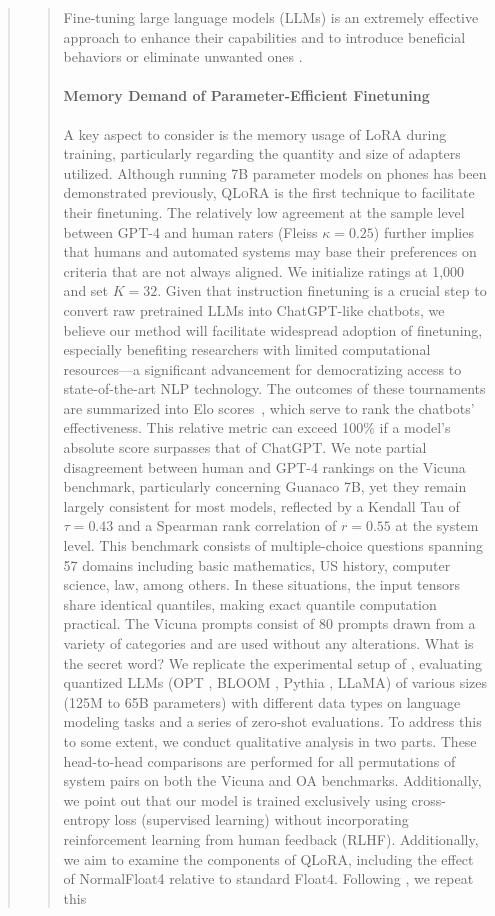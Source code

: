 \begin{quote}
\begin{quote}
Fine-tuning large language models (LLMs) is an extremely effective approach to enhance their capabilities \citep{min2021metaicl, wei2021finetuned, ouyang2022training, wang2022super, wang2022self, liu2022few} and to introduce beneficial behaviors or eliminate unwanted ones \citep{ouyang2022training,askell2021general,bai2022training}. \paragraph{Memory Demand of Parameter-Efficient Finetuning} A key aspect to consider is the memory usage of LoRA during training, particularly regarding the quantity and size of adapters utilized. Although running 7B parameter models on phones has been demonstrated previously, \textsc{QLoRA} is the first technique to facilitate their finetuning. The relatively low agreement at the sample level between GPT-4 and human raters (Fleiss $\kappa=0.25$) further implies that humans and automated systems may base their preferences on criteria that are not always aligned. We initialize ratings at 1,000 and set $K=32$. Given that instruction finetuning is a crucial step to convert raw pretrained LLMs into ChatGPT-like chatbots, we believe our method will facilitate widespread adoption of finetuning, especially benefiting researchers with limited computational resources—a significant advancement for democratizing access to state-of-the-art NLP technology. The outcomes of these tournaments are summarized into Elo scores~\citep{elo1967proposed, elo1978rating}, which serve to rank the chatbots' effectiveness. This relative metric can exceed 100\% if a model's absolute score surpasses that of ChatGPT. We note partial disagreement between human and GPT-4 rankings on the Vicuna benchmark, particularly concerning Guanaco 7B, yet they remain largely consistent for most models, reflected by a Kendall Tau of $\tau=0.43$ and a Spearman rank correlation of $r=0.55$ at the system level. This benchmark consists of multiple-choice questions spanning 57 domains including basic mathematics, US history, computer science, law, among others. In these situations, the input tensors share identical quantiles, making exact quantile computation practical. The Vicuna prompts consist of 80 prompts drawn from a variety of categories and are used without any alterations. What is the secret word? We replicate the experimental setup of \citet{dettmers2022case}, evaluating quantized LLMs (OPT \citep{zhang2022opt}, BLOOM \cite{scao2022bloom}, Pythia \cite{biderman2023pythia}, LLaMA) of various sizes (125M to 65B parameters) with different data types on language modeling tasks and a series of zero-shot evaluations. To address this to some extent, we conduct qualitative analysis in two parts. These head-to-head comparisons are performed for all permutations of system pairs on both the Vicuna and OA benchmarks. Additionally, we point out that our model is trained exclusively using cross-entropy loss (supervised learning) without incorporating reinforcement learning from human feedback (RLHF). Additionally, we aim to examine the components of QLoRA, including the effect of NormalFloat4 relative to standard Float4. Following \citet{vicuna2023}, we repeat this 
\end{quote}
\end{quote}
